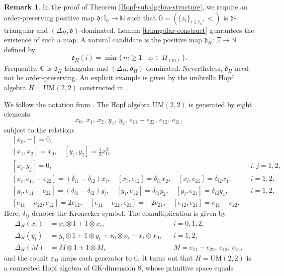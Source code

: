 \documentclass{article}
\theoremstyle{plain}
\theoremstyle{definition}
\newtheorem{remark}[thm]{Remark}
\numberwithin{equation}{section}
\newcommand{\GG}{\mathbb{G}}
\newcommand{\II}{\mathbb{I}}
\newcommand{\dd}{\mathfrak{d}}
\begin{document}
	\begin{remark}\label{example-order-preserving}
		In the proof of Theorem \ref{Hopf-subalgebra-structure}, we require an order-preserving positive map $\dd\colon\II_{n}\to\mathbb{N}$ such that $\GG=(\{z_{i}\}_{i\in \II_{n}}, <)$ is $\dd$-triangular and $(\Delta_{H},\dd)$-dominated. Lemma \ref{triangular-construct} guarantees the existence of such a map. A natural candidate is the positive map $\dd_{H}\colon\Xi \to \mathbb{N}$ defined by
		\[
		\dd_{H}(i)=\min\{\, m \geq 1 \mid z_{i}\in H_{(m)}\,\}.
		\]
		Frequently, $\GG$ is $\dd_{H}$-triangular and $(\Delta_{H},\dd_{H})$-dominated. Nevertheless, $\dd_{H}$ need not be order-preserving. An explicit example is given by the umbrella Hopf algebra $H=\mathrm{UM}(2,2)$ constructed in \cite{HW26}.
		
		We follow the notation from \cite{HW26}. The Hopf algebra $\mathrm{UM}(2,2)$ is generated by eight elements
		\[
		x_{0},\,x_{1},\,x_{2},\,y_{1},\,y_{2},\,
		e_{11}-e_{22},\,e_{12},\,e_{21},
		\]
		subject to the relations
		\begin{align*}
			& [x_{0},-]=0,  \\
			& [x_{1},x_{2}]=x_{0},    \quad 		[y_{1},y_{2}]=\tfrac13 x_{0}^{3},\\
			& [x_{i},y_{j}]=0, && i,j=1,2, \\
			& [x_{i},e_{11}-e_{22}]=(\delta_{i1}-\delta_{i2})x_{i}, \quad 
			[x_{i},e_{12}]=\delta_{i1}x_{2}, \quad
			[x_{i},e_{21}]=\delta_{i2}x_{1}, && i=1,2, \\
			& [y_{i},e_{11}-e_{22}]=(\delta_{i1}-\delta_{i2})y_{i}, \quad 
			[y_{i},e_{12}]=\delta_{i1}y_{2}, \quad 
			[y_{i},e_{21}]=\delta_{i2}y_{1}, && i=1,2, \\
			& [e_{11}-e_{22},e_{12}]=2e_{12}, \quad 
			[e_{11}-e_{22},e_{21}]=-2e_{21}, \quad 
			[e_{12},e_{21}]=e_{11}-e_{22}.
		\end{align*}
		Here, $\delta_{ij}$ denotes the Kronecker symbol. The comultiplication is given by
		\begin{align*}
			\Delta_{H}(x_{i})&=x_{i}\otimes1+1\otimes x_{i}, &&  i=0,1,2,\\
			\Delta_{H}(y_{i})&=y_{i}\otimes1+1\otimes y_{i}+x_{0}\otimes x_{i}-x_{i}\otimes x_{0}, &&  i=1,2, \\
			\Delta_{H}(M)&=M\otimes1+1\otimes M, &&  M = e_{11}-e_{22},\, e_{12},\, e_{21},
		\end{align*}
		and the counit $\varepsilon_{H}$ maps each generator to $0$.
		It turns out that $H=\mathrm{UM}(2,2)$ is a connected Hopf algebra of GK-dimension $8$, whose primitive space equals

\end{remark}
\end{document}
